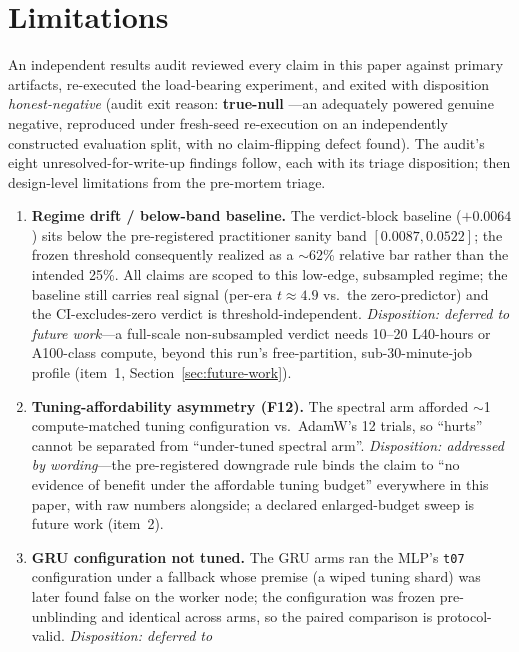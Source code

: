 \section{Limitations}
\label{sec:limitations}

An independent results audit reviewed every claim in this paper against
primary artifacts, re-executed the load-bearing experiment, and exited with
disposition \emph{honest-negative} (audit exit reason: \textbf{true-null}
---an adequately powered genuine negative, reproduced under fresh-seed
re-execution on an independently constructed evaluation split, with no
claim-flipping defect found). The audit's eight unresolved-for-write-up
findings follow, each with its triage disposition; then design-level
limitations from the pre-mortem triage.

\begin{enumerate}
  \item \textbf{Regime drift / below-band baseline.} The verdict-block
    baseline ($+0.0064$) sits below the pre-registered practitioner sanity
    band $[0.0087, 0.0522]$; the frozen threshold consequently realized as
    a $\sim$62\% relative bar rather than the intended 25\%. All claims
    are scoped to this low-edge, subsampled regime; the baseline still
    carries real signal (per-era $t \approx 4.9$ vs.\ the zero-predictor)
    and the CI-excludes-zero verdict is threshold-independent.
    \emph{Disposition: deferred to future work}---a full-scale
    non-subsampled verdict needs 10--20 L40-hours or A100-class compute,
    beyond this run's free-partition, sub-30-minute-job profile (item~1,
    Section~\ref{sec:future-work}).
  \item \textbf{Tuning-affordability asymmetry (F12).} The spectral arm
    afforded $\sim$1 compute-matched tuning configuration vs.\ AdamW's 12
    trials, so ``hurts'' cannot be separated from ``under-tuned spectral
    arm''. \emph{Disposition: addressed by wording}---the pre-registered
    downgrade rule binds the claim to ``no evidence of benefit under the
    affordable tuning budget'' everywhere in this paper, with raw numbers
    alongside; a declared enlarged-budget sweep is future work (item~2).
  \item \textbf{GRU configuration not tuned.} The GRU arms ran the MLP's
    \texttt{t07} configuration under a fallback whose premise (a wiped
    tuning shard) was later found false on the worker node; the
    configuration was frozen pre-unblinding and identical across arms, so
    the paired comparison is protocol-valid. \emph{Disposition: deferred to
}
\end{enumerate}
